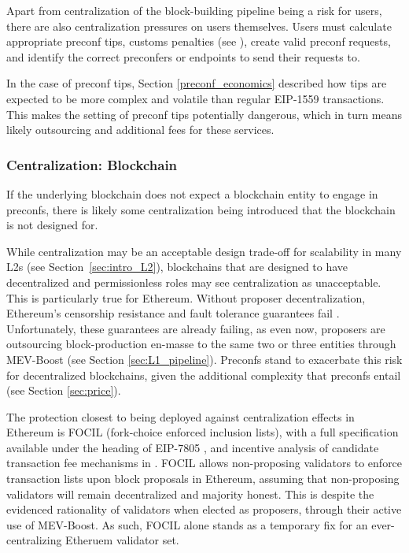 \documentclass[a4paper]{article}
\theoremstyle{boldstyle}
\begin{document}
    Apart from centralization of the block-building pipeline being a risk for users, there are also centralization pressures on users themselves. Users must calculate appropriate preconf tips, customs penalties (see \cite{W:User-DefinedPenalties:EnsuringHonestPreconfBehavior}), create valid preconf requests, and identify the correct preconfers or endpoints to send their requests to.
    
    In the case of preconf tips, Section \ref{preconf_economics} described how tips are expected to be more complex and volatile than regular EIP-1559 transactions. This makes the setting of preconf tips potentially dangerous, which in turn means likely outsourcing and additional fees for these services. 
    
    
    \subsubsection{Centralization: Blockchain}

    If the underlying blockchain does not expect a blockchain entity to engage in preconfs, there is likely some centralization being introduced that the blockchain is not designed for. 

    While centralization may be an acceptable design trade-off for scalability in many L2s (see Section~\ref{sec:intro_L2}), blockchains that are designed to have decentralized and permissionless roles may see centralization as unacceptable. This is particularly true for Ethereum. Without proposer decentralization, Ethereum's censorship resistance and fault tolerance guarantees fail \cite{W:DecentralizedCryptoNeedsYou}. Unfortunately, these guarantees are already failing, as even now, proposers are outsourcing block-production en-masse to the same two or three entities through MEV-Boost \cite{MEVBoostShares} (see Section \ref{sec:L1_pipeline}). Preconfs stand to exacerbate this risk for decentralized blockchains, given the additional complexity that preconfs entail (see Section \ref{sec:price}). 

    The protection closest to being deployed  against centralization effects in Ethereum is FOCIL (fork-choice enforced inclusion lists), with a full specification available under the heading of EIP-7805 \cite{EIP7805}, and incentive analysis of candidate transaction fee mechanisms in \cite{stouka2025multipleproposertransactionfee}. FOCIL allows non-proposing validators to enforce transaction lists upon block proposals in Ethereum, assuming that non-proposing validators will remain decentralized and majority honest. This is despite the evidenced rationality of validators when elected as proposers, through their active use of MEV-Boost. As such, FOCIL alone stands as a temporary fix for an ever-centralizing Etheruem validator set. 
    
\end{document}
